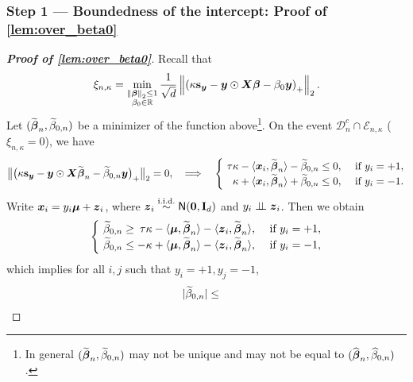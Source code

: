 \subsubsection{Step 1 --- Boundedness of the intercept: Proof of \cref{lem:over_beta0}}
\label{subsubsec:over_beta0}
\begin{proof}[\textbf{Proof of \cref{lem:over_beta0}}]
Recall that
\begin{equation*}
    \xi_{n, \kappa} = \min_{ \substack{ \left\|{{\boldsymbol{\beta}}}\right\|_2 \le 1 \\ \beta_0 \in \mathbb{R}} } \frac{1}{\sqrt{d}} \left\|{ \left( \kappa \mathrm{\bf s}_{\text{\boldmath $y$}} - \text{\boldmath $y$} \odot \text{\boldmath $X$} {\boldsymbol{\beta}}  - \beta_0 \text{\boldmath $y$} \right)_+ }\right\|_2.
\end{equation*}
Let $(\widetilde{{\boldsymbol{\beta}}}_n, \widetilde\beta_{0, n})$ be a minimizer of the function above\footnote{
    In general $(\widetilde{{\boldsymbol{\beta}}}_n, \widetilde\beta_{0, n})$ may not be unique and may not be equal to $(\widehat{{\boldsymbol{\beta}}}_n, \widehat\beta_{0, n})$.
}. On the event $\mathcal{D}_n^c \cap \mathcal{E}_{n ,\kappa}$ ($\xi_{n, \kappa} = 0$), we have 
\begin{equation*}
        \bigl\| \bigl( \kappa \bs_\yy - \yy \odot \XX \wt\vbeta_n  -  \wt\beta_{0, n} \yy \bigr)_+  \bigr\|_2 = 0, 
        \quad
        \Longrightarrow
        \quad
        \begin{cases} 
            \ \tau \kappa - \< \xx_i, \wt\vbeta_n \> - \wt\beta_{0, n} \le 0, & \ \text{if} \ y_i = + 1, \\
            \ \mathmakebox[\widthof{$\tau\kappa$}][r]{\kappa} + \< \xx_i, \wt\vbeta_n \> + \wt\beta_{0, n} \le 0,      & \ \text{if} \ y_i = -1.
        \end{cases}
\end{equation*}
Write $\text{\boldmath $x$}_i = y_i \text{\boldmath $\mu$} + \text{\boldmath $z$}_i$, where $\text{\boldmath $z$}_i \overset{\text{i.i.d.}}{\sim} {\sf N}(\mathrm{\bf 0}, \mathrm{\bf I}_d)$ and $y_i \perp\!\!\!\perp \text{\boldmath $z$}_i$. Then we obtain
\begin{equation*}
    \begin{cases} 
        \ \wt\beta_{0, n} \ge \mathmakebox[\widthof{$-$}][r]{\tau}
        \kappa - \< \bmu, \wt\vbeta_n \> - \< \zz_i, \wt\vbeta_n \> , & \ \text{if} \ y_i = + 1, \\
        \ \wt\beta_{0, n} \le    - \kappa + \< \bmu, \wt\vbeta_n \> - \< \zz_i, \wt\vbeta_n \> ,      & \ \text{if} \ y_i = -1,
    \end{cases}
\end{equation*}
which implies for all $i, j$ such that $y_i = +1, y_j = -1$,
\begin{equation*}
    \begin{aligned}
        | \wt\beta_{0, n} | & \le 

\end{aligned}
\end{equation*}
\end{proof}
